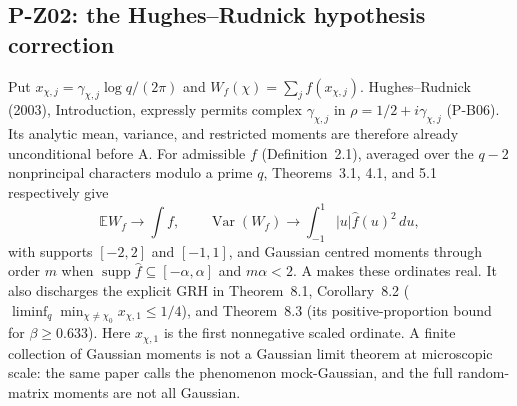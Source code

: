 \subsection{P-Z02: the Hughes--Rudnick hypothesis correction}
Put $x_{\chi,j}=\gamma_{\chi,j}\log q/(2\pi)$ and $W_f(\chi)=\sum_jf(x_{\chi,j})$. Hughes--Rudnick (2003), Introduction, expressly permits complex $\gamma_{\chi,j}$ in $\rho=1/2+i\gamma_{\chi,j}$ (P-B06). Its analytic mean, variance, and restricted moments are therefore already unconditional before A. For admissible $f$ (Definition~2.1), averaged over the $q-2$ nonprincipal characters modulo a prime $q$, Theorems~3.1, 4.1, and 5.1 respectively give
\[
 \mathbb E W_f\longrightarrow\int f,\qquad
 \operatorname{Var}(W_f)\longrightarrow\int_{-1}^1|u|\widehat f(u)^2\,du,
\]
with supports $[-2,2]$ and $[-1,1]$, and Gaussian centred moments through order $m$ when $\operatorname{supp}\widehat f\subseteq[-\alpha,\alpha]$ and $m\alpha<2$. A makes these ordinates real. It also discharges the explicit GRH in Theorem~8.1, Corollary~8.2 ($\liminf_q\min_{\chi\ne\chi_0}x_{\chi,1}\le1/4$), and Theorem~8.3 (its positive-proportion bound for $\beta\ge0.633$). Here $x_{\chi,1}$ is the first nonnegative scaled ordinate. A finite collection of Gaussian moments is not a Gaussian limit theorem at microscopic scale: the same paper calls the phenomenon mock-Gaussian, and the full random-matrix moments are not all Gaussian.

